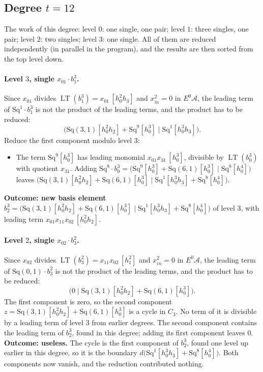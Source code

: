 \documentclass[11pt]{article}
\newcommand{\Sq}{\mathrm{Sq}}
\newcommand{\A}{\mathcal{A}}
\DeclareMathOperator{\LT}{LT}
\begin{document}
\subsection*{Degree $t = 12$}
\noindent The work of this degree: level $0$: one single, one pair; level $1$: three singles, one pair; level $2$: two singles; level $3$: one single. All of them are reduced independently (in parallel in the program), and the results are then sorted from the top level down.
\medskip
\paragraph{Level $3$, single $x_{01}\cdot b^{3}_{1}$.} Since $x_{01}$ divides $\LT(b^{3}_{1}) = x_{01}\,[h_0^2h_3]$ and $x_{in}^2 = 0$ in $E^0\A$, the leading term of $\Sq^{1}\cdot b^{3}_{1}$ is not the product of the leading terms, and the product has to be reduced:
\[\bigl(\Sq(3,1)[h_0^2h_2] + \Sq^{9}[h_0^3] \;\big|\; \Sq^{1}[h_0^3h_3]\bigr).\]
Reduce the first component modulo level $3$:
\begin{itemize}
\item The term $\Sq^{9}[h_0^3]$ has leading monomial $x_{01}x_{31}\,[h_0^3]$, divisible by $\LT(b^{3}_{0})$ with quotient $x_{31}$. Adding $\Sq^{8}\cdot b^{3}_{0} = \bigl(\Sq^{9}[h_0^3] + \Sq(6,1)[h_0^3] \;\big|\; \Sq^{8}[h_0^4]\bigr)$ leaves $\bigl(\Sq(3,1)[h_0^2h_2] + \Sq(6,1)[h_0^3] \;\big|\; \Sq^{1}[h_0^3h_3] + \Sq^{8}[h_0^4]\bigr)$.
\end{itemize}
\textbf{Outcome: new basis element} $b^{3}_{2} = \bigl(\Sq(3,1)[h_0^2h_2] + \Sq(6,1)[h_0^3] \;\big|\; \Sq^{1}[h_0^3h_3] + \Sq^{8}[h_0^4]\bigr)$ of level $3$, with leading term $x_{01}x_{11}x_{02}\,[h_0^2h_2]$.
\medskip
\paragraph{Level $2$, single $x_{02}\cdot b^{2}_{3}$.} Since $x_{02}$ divides $\LT(b^{2}_{3}) = x_{11}x_{02}\,[h_1^2]$ and $x_{in}^2 = 0$ in $E^0\A$, the leading term of $\Sq(0,1)\cdot b^{2}_{3}$ is not the product of the leading terms, and the product has to be reduced:
\[\bigl(0 \;\big|\; \Sq(3,1)[h_0^2h_2] + \Sq(6,1)[h_0^3]\bigr).\]
The first component is zero, so the second component $z = \Sq(3,1)[h_0^2h_2] + \Sq(6,1)[h_0^3]$ is a cycle in $C_{3}$.
No term of it is divisible by a leading term of level $3$ from earlier degrees.
The second component contains the leading term of $b^{3}_{2}$, found in this degree; adding its first component leaves $0$.
\textbf{Outcome: useless.} The cycle is the first component of $b^{3}_{2}$, found one level up earlier in this degree, so it is the boundary $d\bigl(\Sq^{1}[h_0^3h_3] + \Sq^{8}[h_0^4]\bigr)$. Both components now vanish, and the reduction contributed nothing.
\medskip
\end{document}

